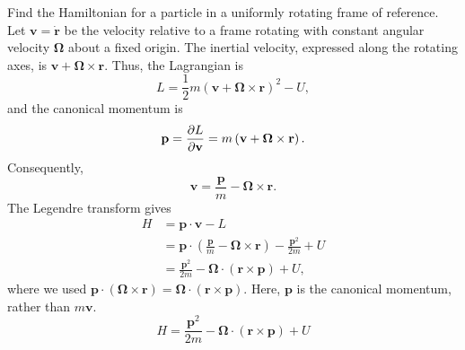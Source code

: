 
\begin{problem}[title={Hamiltonian in a uniformly rotating frame}]
{
Find the Hamiltonian for a particle in a uniformly rotating frame of reference.
}
{
Let $\mathbf{v} = \Dot{\mathbf{r}}$ be the velocity relative to a frame rotating with constant angular velocity $\boldsymbol{\Omega}$ about a fixed origin. The inertial velocity, expressed along the rotating axes, is $\mathbf{v} + \boldsymbol{\Omega}\times\mathbf{r}$. Thus, the Lagrangian is
\begin{equation*}
    L = \frac{1}{2}m\left(\mathbf{v} + \boldsymbol{\Omega}\times\mathbf{r}\right)^2 - U,
\end{equation*}
and the canonical momentum is
\begin{equation*}
    \mathbf{p} = \frac{\partial L}{\partial \mathbf{v}} = m\left(\mathbf{v} + \boldsymbol{\Omega}\times\mathbf{r}\right).
\end{equation*}
Consequently,
\begin{equation*}
    \mathbf{v} = \frac{\mathbf{p}}{m} - \boldsymbol{\Omega}\times\mathbf{r}.
\end{equation*}
The Legendre transform gives
\begin{align*}
    H &= \mathbf{p}\cdot\mathbf{v} - L \\
    &= \mathbf{p}\cdot\left(\frac{\mathbf{p}}{m} - \boldsymbol{\Omega}\times\mathbf{r}\right) - \frac{\mathbf{p}^2}{2m} + U \\
    &= \frac{\mathbf{p}^2}{2m} - \boldsymbol{\Omega}\cdot\left(\mathbf{r}\times\mathbf{p}\right) + U,
\end{align*}
where we used $\mathbf{p}\cdot\left(\boldsymbol{\Omega}\times\mathbf{r}\right) = \boldsymbol{\Omega}\cdot\left(\mathbf{r}\times\mathbf{p}\right)$. Here, $\mathbf{p}$ is the canonical momentum, rather than $m\mathbf{v}$.
}
{
\begin{equation*}
    H = \frac{\mathbf{p}^2}{2m} - \boldsymbol{\Omega}\cdot\left(\mathbf{r}\times\mathbf{p}\right) + U
\end{equation*}
}
\end{problem}


